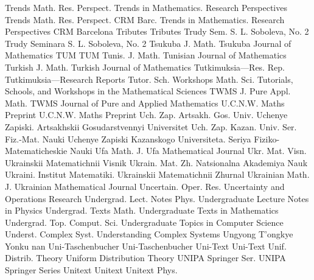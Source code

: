 {Trends Math. Res. Perspect.}
{Trends in Mathematics. Research Perspectives}
{Trends Math. Res. Perspect. CRM Barc.}
{Trends in Mathematics. Research Perspectives CRM Barcelona}
{Tributes}
{Tributes}
{Trudy Sem. S. L. Soboleva, No. 2}
{Trudy Seminara S. L. Soboleva, No. 2}
{Tsukuba J. Math.}
{Tsukuba Journal of Mathematics}
{TUM}
{TUM}
{Tunis. J. Math.}
{Tunisian Journal of Mathematics}
{Turkish J. Math.}
{Turkish Journal of Mathematics}
{Tutkimuksia---Res. Rep.}
{Tutkimuksia---Research Reports}
{Tutor. Sch. Workshops Math. Sci.}
{Tutorials, Schools, and Workshops in the Mathematical Sciences}
{TWMS J. Pure Appl. Math.}
{TWMS Journal of Pure and Applied Mathematics}
{U.C.N.W. Maths Preprint}
{U.C.N.W. Maths Preprint}
{Uch. Zap. Artsakh. Gos. Univ.}
{Uchenye Zapiski. Artsakhskii Gosudarstvennyi Universitet}
{Uch. Zap. Kazan. Univ. Ser. Fiz.-Mat. Nauki}
{Uchenye Zapiski Kazanskogo Universiteta. Seriya Fiziko-Matematicheskie Nauki}
{Ufa Math. J.}
{Ufa Mathematical Journal}
{Ukr. Mat. Visn.}
{Ukrainskii Matematichnii Visnik}
{Ukrain. Mat. Zh.}
{Natsionalna Akademiya Nauk Ukraini. Institut Matematiki. Ukrainskii Matematichnii Zhurnal}
{Ukrainian Math. J.}
{Ukrainian Mathematical Journal}
{Uncertain. Oper. Res.}
{Uncertainty and Operations Research}
{Undergrad. Lect. Notes Phys.}
{Undergraduate Lecture Notes in Physics}
{Undergrad. Texts Math.}
{Undergraduate Texts in Mathematics}
{Undergrad. Top. Comput. Sci.}
{Undergraduate Topics in Computer Science}
{Underst. Complex Syst.}
{Understanding Complex Systems}
{Ungyong T'ongkye Yonku}
{nan}
{Uni-Taschenbucher}
{Uni-Taschenbucher}
{Uni-Text}
{Uni-Text}
{Unif. Distrib. Theory}
{Uniform Distribution Theory}
{UNIPA Springer Ser.}
{UNIPA Springer Series}
{Unitext}
{Unitext}
{Unitext Phys.}
